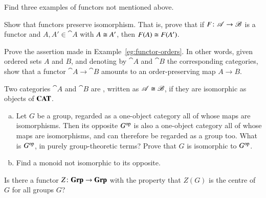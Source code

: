 \exs


\begin{question}
Find three examples of functors not mentioned above.
\end{question}


\begin{question}        
\label{ex:ftrs-pres-iso}
Show that functors preserve isomorphism.%
%
%
That is, prove that if $F\from \cat{A} \to \cat{B}$ is a functor and $A, A'
\in \cat{A}$ with $A \cong A'$, then $F(A) \cong F(A')$.
\end{question}


\begin{question}
\label{ex:functor-orders}
Prove the assertion made in Example~\ref{eg:functor-orders}.  In other
words, given ordered sets $A$ and $B$, and denoting by $\cat{A}$ and
$\cat{B}$ the corresponding categories, show that a functor $\cat{A} \to
\cat{B}$ amounts to an order-preserving%
%
%
%
map $A \to B$.
\end{question}


\begin{question}
Two categories $\cat{A}$ and $\cat{B}$ are ,%
%
%
%
written as $\mathscr{A} \cong \mathscr{B}$,%
%
%
if they are isomorphic as objects of $\mathbf{CAT}$.  
% 
\begin{enumerate}[(b)]
\item 
Let $G$ be a group, regarded as a one-object%
%
%
category all of whose maps are isomorphisms.  Then its opposite $G^{\mathrm{op}}$ is
also a one-object category all of whose maps are isomorphisms, and can
therefore be regarded as a group too.  What is $G^{\mathrm{op}}$, in purely
group-theoretic terms?  Prove that $G$ is isomorphic to $G^{\mathrm{op}}$.

\item 
Find a monoid%
%
%
not isomorphic to its opposite.
\end{enumerate}
\end{question}


\begin{question}
Is there a functor $Z \from \Grp \to \Grp$ with the property that $Z(G)$ is
the centre%
%
%
of $G$ for all groups $G$?
\end{question}


